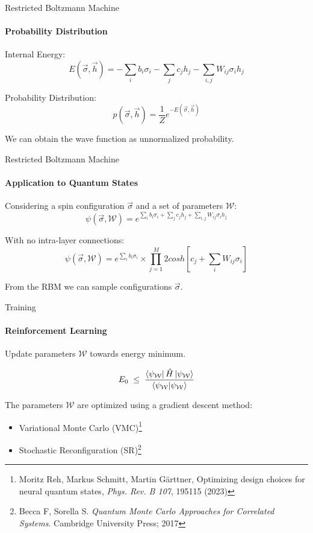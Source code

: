 \documentclass{beamer}
\begin{document}
\begin{frame}{Restricted Boltzmann Machine}
\framesubtitle{Probability Distribution}
Internal Energy:
$$E(\vec{\sigma}, \vec{h}) = -\sum_{i} b_i \sigma_i - \sum_{j} c_j h_j - \sum_{i,j} W_{ij} \sigma_i h_j$$

Probability Distribution:
$$p(\vec{\sigma}, \vec{h}) = \frac{1}{Z} e^{-E(\vec{\sigma}, \vec{h})}$$
\baselineskip

We can obtain the wave function as unnormalized probability.
\end{frame}

\begin{frame}{Restricted Boltzmann Machine}
\framesubtitle{Application to Quantum States}
Considering a spin configuration $\vec{\sigma}$ and a set of parameters $\mathcal{W}$:
$$\psi\left( \vec{\sigma}, \mathcal{W} \right) = e^{\sum_{i} b_i \sigma_i + \sum_{j} c_j h_j + \sum_{i,j} W_{ij} \sigma_i h_j}$$

With no intra-layer connections:
$$\psi\left( \vec{\sigma}, \mathcal{W} \right) = e^{\sum_{i} b_i \sigma_i} \times \prod_{j=1}^{M} {2 cosh\left[c_j + \sum_{i} W_{ij} \sigma_i\right]}$$

From the RBM we can sample configurations $\vec{\sigma}$.

\end{frame}

\begin{frame}{Training}
\framesubtitle{Reinforcement Learning}
Update parameters $\mathcal{W}$ towards energy minimum.

$$
E_0 \;\le\;
\frac{\bra{\psi_{\mathcal{W}}} \hat H \ket{\psi_{\mathcal{W}}} }
	{\bra{\psi_{\mathcal{W}}} \ket{\psi_{\mathcal{W}}}}
$$
\baselineskip

The parameters $\mathcal{W}$ are optimized using a gradient descent method:
\begin{itemize}
	\item Variational Monte Carlo (VMC)\footnote{Moritz Reh, Markus Schmitt, Martin Gärttner, Optimizing design choices for neural quantum states, \textit{Phys. Rev. B 107}, 195115 (2023)}
	\item Stochastic Reconfiguration (SR)\footnote{Becca F, Sorella S. \textit{Quantum Monte Carlo Approaches for Correlated Systems}. Cambridge University Press; 2017}
\end{itemize}

\end{frame}
\end{document}
